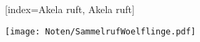 [index={Akela ruft, Akela ruft}]

\beginverse
\endverse
\texttt{[image: Noten/SammelrufWoelflinge.pdf]}

\endsong

